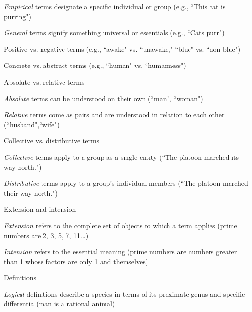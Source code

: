 \documentclass{report}
\begin{document}
\begin{outline}
\begin{outline}
      \begin{outline}
      \item \textit{Empirical} terms designate a specific individual or group (e.g., ``This cat is purring")
      \item \textit{General} terms signify something universal or essentials (e.g., ``Cats purr")
      \end{outline}
      \item Positive vs. negative terms (e.g., ``awake" vs. ``unawake," ``blue" vs. ``non-blue")
      \item Concrete vs. abstract terms (e.g., ``human" vs. ``humanness")
      \item Absolute vs. relative terms
        \begin{outline}
          \item \textit{Absolute} terms can be understood on their own (``man", ``woman")
          \item \textit{Relative} terms come as pairs and are understood in relation to each other (``husband",``wife")
          \end{outline}
        \item Collective vs. distributive terms
          \begin{outline}
            \item \textit{Collective} terms apply to a group as a single entity (``The platoon marched its way north.")
            \item \textit{Distributive} terms apply to a group's individual members (``The platoon marched their way north.")
            \end{outline}
            \item Extension and intension
            \begin{outline}
              \item \textit{Extension} refers to the complete set of objects to which a term applies (prime numbers are 2, 3, 5, 7, 11...)
              \item \textit{Intension} refers to the essential meaning (prime numbers are numbers greater than 1 whose factors are only 1 and themselves)
              \end{outline}
              \item Definitions
              \begin{outline}
                \item \textit{Logical} definitions describe a species in terms of its proximate genus and specific differentia (man is a rational animal)

\end{outline}
\end{outline}
\end{outline}
\end{document}
